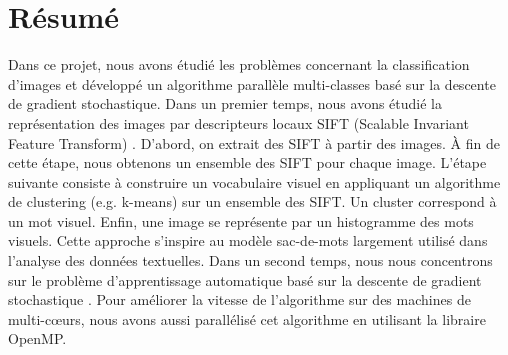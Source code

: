 \clearpage
\thispagestyle{plain}
\chapter*{Résumé}

Dans ce projet, nous avons étudié les problèmes concernant la classification d'images et développé un algorithme parallèle multi-classes basé sur la descente de gradient stochastique. Dans un premier temps, nous avons étudié la représentation des images par descripteurs locaux SIFT (Scalable Invariant Feature Transform) \cite{low99}. D'abord, on extrait des SIFT à partir des images. À fin de cette étape, nous obtenons un ensemble des SIFT pour chaque image. L'étape suivante consiste à construire un vocabulaire visuel en appliquant un algorithme de clustering (e.g. k-means) sur un ensemble des SIFT. Un cluster correspond à un mot visuel. Enfin, une image se représente par un histogramme des mots visuels. Cette approche s'inspire au modèle sac-de-mots largement utilisé dans l'analyse des données textuelles. Dans un second temps, nous nous concentrons sur le problème d'apprentissage automatique basé sur la descente de gradient stochastique \cite{sss07}. Pour améliorer la vitesse de l'algorithme sur des machines de multi-cœurs, nous avons aussi parallélisé cet algorithme en utilisant la libraire OpenMP.


